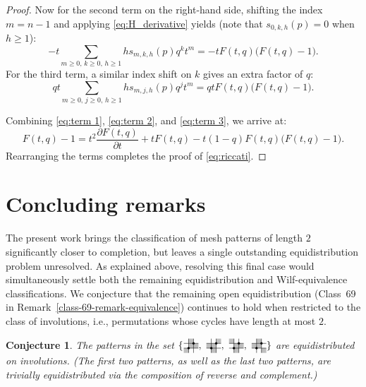 \documentclass[12pt]{article}
\newtheorem{conj}{Conjecture}
\newcommand{\pattern}[4]{										
	\raisebox{0.6ex}{
		\begin{tikzpicture}[scale=0.35, baseline=(current bounding box.center), #1]
		\foreach \x/\y in {#4}		\fill[gray!50] (\x,\y) rectangle +(1,1);

		\draw (0.01,0.01) grid (#2+0.99,#2+0.99);
		\foreach \x/\y in {#3}		\filldraw (\x,\y) circle (6pt);
		\end{tikzpicture}}
}
\begin{document}
\begin{proof}
  Now for the second term on the right-hand side, shifting the index $m = n-1$ and applying \eqref{eq:H_derivative} yields (note that $s_{0,k,h}(p)=0$ when $h\ge 1$):
  \begin{equation}\label{eq:term 2}
    - t \sum_{m \ge 0,\,k \ge 0,\,h \ge 1} h s_{m,k,h}(p) q^k t^m = -t F(t,q)\big(F(t,q) - 1\big).
  \end{equation}
  For the third term, a similar index shift on $k$ gives an extra factor of $q$:
  \begin{equation}\label{eq:term 3}
    qt \sum_{m \ge 0,\, j \ge 0,\, h \ge 1} h s_{m,j,h}(p) q^j t^m = qt F(t,q)\big(F(t,q) - 1\big).
  \end{equation}

  
  
  
  
  
  
  
  
 
  
  
  Combining \eqref{eq:term 1}, \eqref{eq:term 2}, and \eqref{eq:term 3}, we arrive at:
  \begin{equation*}
    F(t,q) - 1 = t^2 \frac{\partial F(t,q)}{\partial t} + t F(t,q) - t(1-q)F(t,q)\big(F(t,q) - 1\big).
  \end{equation*}
  Rearranging the terms completes the proof of \eqref{eq:riccati}.
\end{proof}


\section*{Concluding remarks}\label{sec:conclud}

The present work brings the classification of mesh patterns of length $2$ significantly closer to completion, but leaves a single outstanding equidistribution problem unresolved. As explained above, resolving this final case would simultaneously settle both the remaining equidistribution and Wilf-equivalence classifications. We conjecture that the remaining open equidistribution (Class~69 in Remark~\ref{class-69-remark-equivalence}) continues to hold when restricted to the class of involutions, i.e., permutations whose cycles have length at most $2$.

\begin{conj}
The patterns in the set $\{\hspace{-1mm}\pattern{scale=0.5}{2}{1/1,2/2}{1/2,1/1,2/1,0/0},
\pattern{scale=0.5}{2}{1/1,2/2}{2/2,0/1,1/1,1/0},
\pattern{scale=0.5}{2}{1/1,2/2}{0/2,1/1,2/1,1/0},
\pattern{scale=0.5}{2}{1/1,2/2}{1/2,0/1,1/1,2/0}\}$ are equidistributed on involutions. (The first two patterns, as well as the last two patterns, are trivially equidistributed via the composition of reverse and complement.)
\end{conj}
\end{document}
